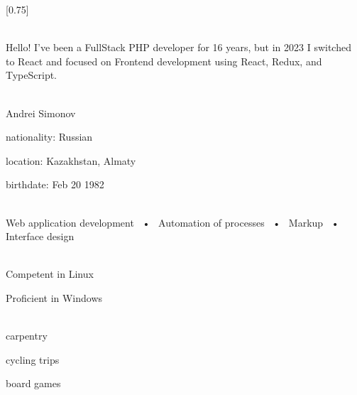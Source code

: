 \documentclass[pastel]{simplehipstercv}
\begin{document}
\setlength{\columnsep}{1.5cm}
[0.75]
\begin{paracol}{2}

\paracolbackgroundoptions


{\setasidefontcolour
\flushright
\begin{center}
\end{center}

\\[0.5em]

{\footnotesize}
Hello! I've been a FullStack PHP developer for 16 years, but in 2023 I switched to React and focused on Frontend development using React, Redux, and TypeScript.
\bigskip

 \\[0.5em]
Andrei Simonov

nationality: Russian 

location: Kazakhstan, Almaty

birthdate: Feb 20 1982

\bigskip

 \\[0.5em]

Web application development ~•~ Automation of processes ~•~ Markup ~•~ Interface design

\bigskip


\bigskip

\\[0.5em]

Competent in Linux

Proficient in Windows

\bigskip

\\[0.5em]

carpentry 

cycling trips

board games

\vspace{4em}


}
\end{paracol}
\end{document}

